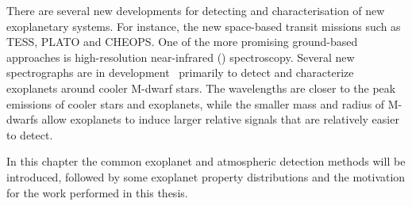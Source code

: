 There are several new developments for detecting and characterisation of new exoplanetary systems. For instance, the new space-based transit missions such as TESS, PLATO and CHEOPS.
One of the more promising ground-based approaches is high-resolution near-infrared (\nir{}) spectroscopy.
Several new \nir{} spectrographs are in development~\citep[e.g.][]{wright_third_2017} primarily to detect and characterize exoplanets around cooler {M-dwarf} stars. The \nir{} wavelengths are closer to the peak emissions of cooler stars and exoplanets, while the smaller mass and radius of {M-dwarfs} allow exoplanets to induce larger relative signals that are relatively easier to detect.

In this chapter the common exoplanet and atmospheric detection methods will be introduced, followed by some exoplanet property distributions and the motivation for the work performed in this thesis.\\










